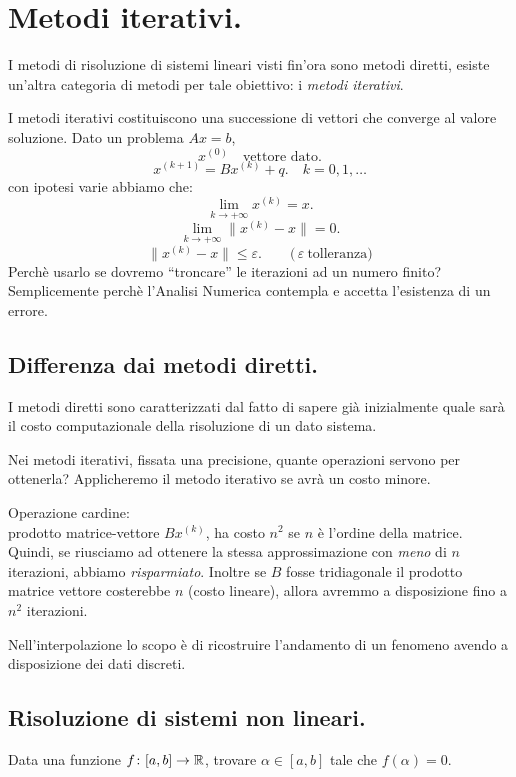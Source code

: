 
\chapter{Metodi iterativi.}
I metodi di risoluzione di sistemi lineari visti fin'ora sono metodi diretti,
esiste un'altra categoria di metodi per tale obiettivo: i \emph{metodi
iterativi}.

I metodi iterativi costituiscono una successione di vettori che converge
al valore soluzione. Dato un problema $Ax=b$,
\[
x^{(0)} \quad \textrm{vettore dato.}
\]
\[
x^{(k+1)} = Bx^{(k)} + q. \quad k = 0, 1, \ldots
\]
con ipotesi varie abbiamo che:
\[\lim_{k \to +\infty}x^{(k)} = x.\]
\[\lim_{k \to +\infty}\|x^{(k)}-x\| = 0.\]
\[\|x^{(k)}-x\| \leq \varepsilon. \qquad \textrm{(}\, \varepsilon \ 
\textrm{tolleranza)}\]
Perchè usarlo se dovremo ``troncare'' le iterazioni ad un numero finito?
Semplicemente perchè l'Analisi Numerica contempla e accetta l'esistenza di un
errore.

\section{Differenza dai metodi diretti.}
I metodi diretti sono caratterizzati dal fatto di sapere già inizialmente 
quale sarà il costo computazionale della risoluzione di un dato sistema.

Nei metodi iterativi, fissata una precisione, quante operazioni servono per
ottenerla? Applicheremo il metodo iterativo se avrà un costo minore.
\begin{flushleft}
Operazione cardine:\\
prodotto matrice-vettore $Bx^{(k)}$, ha costo $n^2$ se $n$ è l'ordine della 
matrice. Quindi, se riusciamo ad ottenere la stessa approssimazione con
\emph{meno} di $n$ iterazioni, abbiamo \emph{risparmiato}.
Inoltre se $B$ fosse tridiagonale il prodotto matrice vettore costerebbe
$n$ (costo lineare), allora avremmo a disposizione fino a $n^2$ iterazioni.
\end{flushleft}

Nell'interpolazione lo scopo è di ricostruire l'andamento di un fenomeno
avendo a disposizione dei dati discreti.

\section{Risoluzione di sistemi non lineari.}
Data una funzione $f \colon [a,b] \to \mathbb{R}$, trovare $\alpha \in [a,b]$ tale
che $f(\alpha) = 0$.

